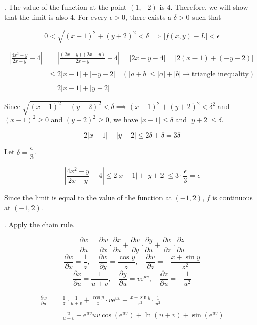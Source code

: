 \documentclass{article}
\begin{document}
\hfill

. The value of the function at the point $(1,-2)$ is $4$. Therefore, we will show that the limit is also $4$. For every $\epsilon>0$, there exists a $\delta>0$ such that

\[0<\sqrt{(x-1)^2+(y+2)^2}<\delta\implies\left|f(x,y)-L\right|<\epsilon\]

\begin{align*}\left|\frac{4x^2-y}{2x+y}-4\right|&=\left|\frac{(2x-y)(2x+y)}{2x+y}-4\right|=\left|2x-y-4\right|=\left|2(x-1)+(-y-2)\right|\\\\&\leq2|x-1|+\left|-y-2\right|\quad \left(|a+b|\leq|a|+|b|\rightarrow\text{triangle inequality}\right)\\\\&=2|x-1|+|y+2|\end{align*}

\hfill

\noindent Since $\sqrt{(x-1)^2+(y+2)^2}<\delta\implies(x-1)^2+(y+2)^2<\delta^2$ and $(x-1)^2\geq0$ and $(y+2)^2\geq0$, we have $|x-1|\leq\delta$ and $|y+2|\leq\delta$.

\[2|x-1|+|y+2|\leq2\delta+\delta=3\delta\]

\hfill

\noindent Let $\delta=\dfrac\epsilon3$.

\[\left|\frac{4x^2-y}{2x+y}-4\right|\leq2|x-1|+|y+2|\leq3\cdot\frac\epsilon3=\epsilon\]

\hfill

\noindent Since the limit is equal to the value of the function at $(-1,2)$, $f$ is continuous at $(-1,2)$.

\hfill

. Apply the chain rule.

\[\frac{\partial w}{\partial u}=\frac{\partial w}{\partial x}\cdot\frac{\partial x}{\partial u}+\frac{\partial w}{\partial y}\cdot\frac{\partial y}{\partial u}+\frac{\partial w}{\partial z}\cdot\frac{\partial z}{\partial u}\]
\[\frac{\partial w}{\partial x}=\frac1z,\quad\frac{\partial w}{\partial y}=\frac{\cos y}z,\quad \frac{\partial w}{\partial z}=-\frac{x+\sin y}{z^2}\]
\[\frac{\partial x}{\partial u}=\frac1{u+v},\quad\frac{\partial y}{\partial u}=v\mathrm{e}^{uv},\quad\frac{\partial z}{\partial u}=-\frac1{u^2}\]

\begin{align*}\frac{\partial w}{\partial u}&=\frac1z\cdot\frac1{u+v}+\frac{\cos y}z\cdot v\mathrm{e}^{uv}+\frac{x+\sin y}{z^2}\cdot\frac1{u^2}\\\\&=\boxed{\frac u{u+v}+\mathrm{e}^{uv}uv\cos\left(\mathrm{e}^{uv}\right)+\ln(u+v)+\sin\left(\mathrm{e}^{uv}\right)}\end{align*}
\end{document}
